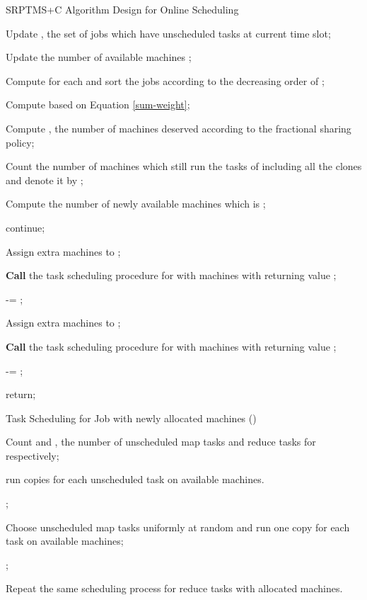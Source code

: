 \documentclass[10pt,conference,compsocconf,letterpaper]{IEEEtran}
\begin{document}
\IncMargin{1em}
\begin{algorithm}
\label{ESE_code}
\caption{SRPTMS+C Algorithm Design for Online Scheduling}
\Indm
\Indp
Update ,  the set of jobs which have unscheduled tasks at current time slot;

Update the number of available machines ;

Compute  for each  and sort the jobs according to the decreasing order of ;

Compute  based on Equation \eqref{sum-weight};

{
Compute , the number of machines  deserved according to the  fractional sharing policy;
}

{
\label{repeat-process}


Count the number of machines which still run the tasks of  including all the clones and denote it by ;



Compute the number of newly available machines which is ;

\If{}
{
 continue;
}
\If{}
{
 Assign  extra machines to ;

\textbf{Call} the task scheduling procedure for  with  machines with returning value ;

  -= ;
}
\If{}
{
 Assign  extra machines to ;

 \textbf{Call} the task scheduling procedure for  with  machines with returning value ;

  -= ;

}
}





return;
\end{algorithm}
\DecMargin{1em}



\IncMargin{1em}
\begin{procedure}
\caption{Task Scheduling for Job  with  newly allocated machines ()}
\Indm
{}
\Indp
Count  and , the number of unscheduled map tasks and reduce tasks for  respectively;

\uIf{ \&\& }
{
 run  copies for each unscheduled task on available machines.

 \Return ;
}
\uElseIf{ \&\& }
{
 Choose  unscheduled map tasks uniformly at random and run one copy for each task on available machines;

 ;
}
\Else
{
Repeat the same scheduling process for reduce tasks with  allocated machines.
}

\label{task-mapping}
\end{procedure}
\DecMargin{1em}
\end{document}
